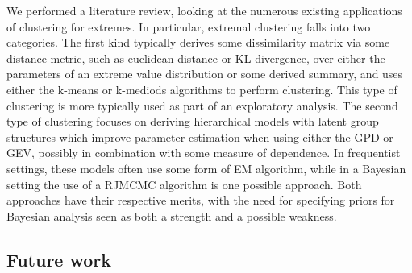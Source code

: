 \documentclass{article}
\numberwithin{equation}{section}
\begin{document}
We performed a literature review, looking at the numerous existing applications of clustering for extremes.
In particular, extremal clustering falls into two categories.
The first kind typically derives some dissimilarity matrix via some distance metric, such as euclidean distance or KL divergence, over either the parameters of an extreme value distribution or some derived summary, and uses either the k-means or k-mediods algorithms to perform clustering. 
This type of clustering is more typically used as part of an exploratory analysis. 
The second type of clustering focuses on deriving hierarchical models with latent group structures which improve parameter estimation when using either the GPD or GEV, possibly in combination with some measure of dependence.
In frequentist settings, these models often use some form of EM algorithm, while in a Bayesian setting the use of a RJMCMC algorithm is one possible approach.
Both approaches have their respective merits, with the need for specifying priors for Bayesian analysis seen as both a strength and a possible weakness.


\subsection{Future work}

\end{document}
